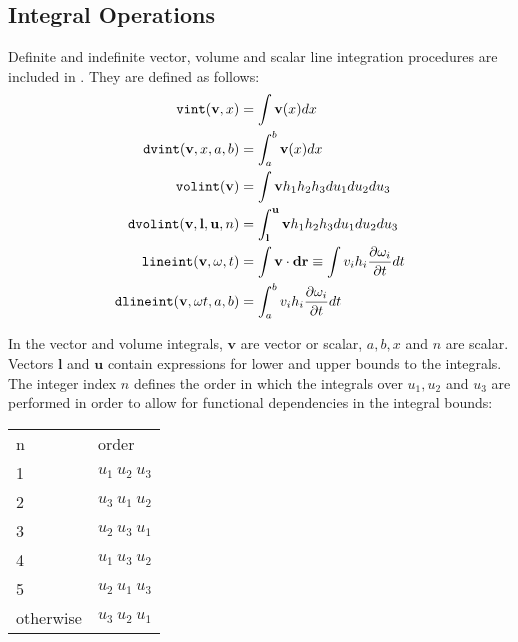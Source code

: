 \subsection{Integral Operations}
Definite and indefinite vector, volume and scalar line integration
procedures are included in .  They are defined as follows:
 
 
 
\hypertarget{operator:VINT}{}
\hypertarget{operator:DVINT}{}
\hypertarget{operator:VOLINT}{}
\hypertarget{operator:DVOLINT}{}
\hypertarget{operator:LINEINT_OV}{}
\hypertarget{operator:DLINEINT}{}
\begin{align*}
\f{vint} (\mathbf{v},x) & =  \int \mathbf{v}(x)dx\\
%
\f{dvint} (\mathbf{v},x, a, b) & =  \int^{b}_{a} \mathbf{v} (x) dx\\
%
\f{volint} (\mathbf{v}) & =  \int \mathbf{v} h_{1} h_{2} h_{3} du_{1} du_{2} du_{3}\\
%
\f{dvolint}(\mathbf{v},\mathbf{l},\mathbf{u},n) & = \int^{\mathbf{u}}_{\mathbf{l}}
\mathbf{v} h_{1} h_{2} h_{3} du_{1} du_{2} du_{3}\\
%
\f{lineint} (\mathbf{v, \omega}, t) & =  \int \mathbf{v} \cdot \mathbf{dr}
\equiv \int v_{i} h_{i} \frac{\partial \omega_{i}}{\partial t} dt\\
%
\f{dlineint} (\mathbf{v, \omega} t, a, b) & = \int^{b}_{a} v_i h_i
\frac{\partial \omega_{i}}{\partial t} dt
\end{align*}

In the vector and volume integrals, $\mathbf{v}$ are vector or scalar,
$a, b,x$ and $n$ are scalar.  Vectors $\mathbf{l}$ and $\mathbf{u}$ contain
expressions for lower and upper bounds to the integrals.  The integer
index $n$ defines the order in which the integrals over $u_1, u_2$ and
$u_3$ are performed in order to allow for functional dependencies in
the integral bounds:

\begin{center}
\begin{tabular}{ll}
n & order\\ 1 & $u_1~u_2~u_3$\\
%
2 & $u_3~u_1~u_2$\\
%
3 & $u_2~u_3~u_1$\\
%
4 & $u_1~u_3~u_2$\\
%
5 & $u_2~u_1~u_3$\\ otherwise & $u_3~u_2~u_1$\\
\end{tabular}
\end{center}


